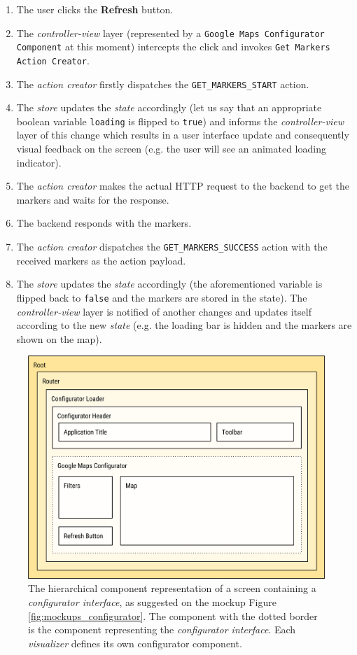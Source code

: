 \begin{enumerate}
\item The user clicks the \textbf{Refresh} button.
\item The \emph{controller-view} layer (represented by a \texttt{Google Maps Configurator Component} at this moment) intercepts the click and invokes \texttt{Get Markers Action Creator}.
\item The \emph{action creator} firstly dispatches the \texttt{GET\_MARKERS\_START}  action.
\item The \emph{store} updates the \emph{state} accordingly (let us say that an appropriate boolean variable \texttt{loading} is flipped to \texttt{true}) and informs the \emph{controller-view} layer of this change which results in a user interface update and consequently visual feedback on the screen (e.g. the user will see an animated loading indicator).
\item The \emph{action creator} makes the actual HTTP request to the backend to get the markers and waits for the response.
\item The backend responds with the markers.
\item The \emph{action creator} dispatches the \texttt{GET\_MARKERS\_SUCCESS} action with the received markers as the action payload.
\item The \emph{store} updates the \emph{state} accordingly (the aforementioned variable is flipped back to \texttt{false} and the markers are stored in the state). The \emph{controller-view} layer is notified of another changes and updates itself according to the new \emph{state} (e.g. the loading bar is hidden and the markers are shown on the map).
\end{enumerate}
\begin{figure}
	\centering
	\includegraphics[width=120mm]{img/04_frontend_react_component_hierarchy.png}
	\caption{The hierarchical component representation of a screen containing a \emph{configurator interface}, as suggested on the mockup Figure \ref{fig:mockups_configurator}. The component with the dotted border is the component representing the \emph{configurator interface}. Each \emph{visualizer} defines its own configurator component.} 
	\label{fig:frontend-react-component-hierarchy}
\end{figure}

